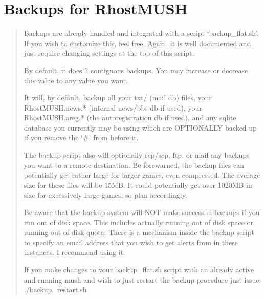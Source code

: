 \documentclass[letterpaper,10pt,english]{sphinxmanual}
\begin{document}
\section{Backups for RhostMUSH}
\label{\detokenize{04-configure:backups-for-rhostmush}}\begin{quote}

\sphinxAtStartPar
Backups are already handled and integrated with a script ‘backup\_flat.sh’.
If you wish to customize this, feel free.  Again, it is well documented and
just require changing settings at the top of this script.

\sphinxAtStartPar
By default, it does 7 contiguous backups.  You may increase or decrease
this value to any value you want.

\sphinxAtStartPar
It will, by default, backup all your txt/
(mail db) files, your RhostMUSH.news.* (internal news/bbs db \textendash{} if used),
your RhostMUSH.areg.* (the autoregistration db \textendash{} if used), and any sqlite
database you currently may be using which are OPTIONALLY backed up if you
remove the ‘\#’ from before it.

\sphinxAtStartPar
The backup script also will optionally rcp/scp, ftp, or mail any backups
you want to a remote destination.  Be forewarned, the backup files can
potentially get rather large for larger games, even compressed.  The
average size for these files will be 1\sphinxhyphen{}5MB.  It could potentially get
over 10\sphinxhyphen{}20MB in size for excessively large games, so plan accordingly.

\sphinxAtStartPar
Be aware that the backup system will NOT make successful backups if you
run out of disk space.  This includes actually running out of disk space
or running out of disk quota.  There is a mechanism inside the backup
script to specify an email address that you wish to get alerts from
in these instances.  I recommend using it.

\sphinxAtStartPar
If you make changes to your backup\_flat.sh script with an already
active and running mush and wish to just restart the backup procedure
just issue: ./backup\_restart.sh
\end{quote}
\end{document}
